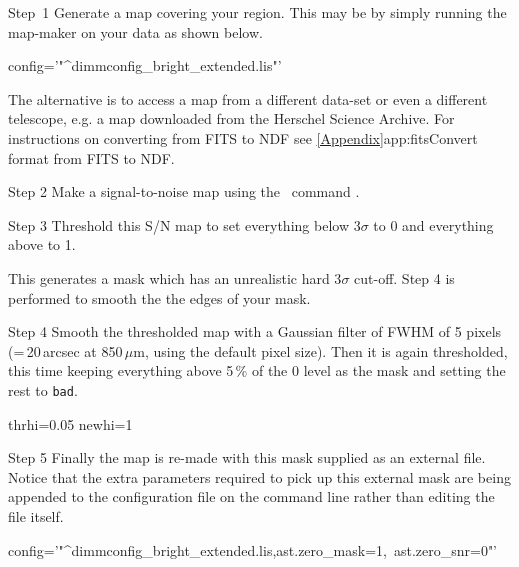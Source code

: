 \begin{aligndesc}
\item[Step~1] Generate a map covering your region. This may be by
  simply running the map-maker on your data as shown below.
\begin{terminalv}
          config='"^dimmconfig_bright_extended.lis"'
\end{terminalv}
The alternative is to access a map from a different data-set or even a
different telescope, e.g. a map downloaded from the Herschel Science
Archive. For instructions on converting from FITS to NDF see
\cref{Appendix}{app:fits}{Convert format from FITS to NDF}.\\

\item[Step 2] Make a signal-to-noise map using the \Kappa\ command
  \makesnr.
\begin{terminalv}
\end{terminalv}

\item[Step 3] Threshold this S/N map to set everything below
  3$\sigma$ to 0 and everything above to 1.
\begin{terminalv}
\end{terminalv}
This generates a mask which has an unrealistic hard 3$\sigma$
cut-off. Step 4 is performed to smooth the the edges of your mask.

\item[Step 4] Smooth the thresholded map with a Gaussian filter
  of FWHM of 5 pixels (=\,20\,arcsec at 850\,$\mu$m, using the default pixel size).
  Then it is again thresholded,
  this time keeping everything above 5\,\% of the 0 level as the mask
  and setting the rest to \texttt{bad}.
\begin{terminalv}
  thrhi=0.05 newhi=1
\end{terminalv}

\item[Step 5] Finally the map is re-made with this mask supplied as an
  external file. Notice that the extra parameters required to pick up
  this external mask are being appended to the configuration file on
  the command line rather than editing the file itself.
\begin{terminalv}
          config='"^dimmconfig_bright_extended.lis,ast.zero_mask=1,\
                   ast.zero_snr=0"'
\end{terminalv}

\end{aligndesc}


